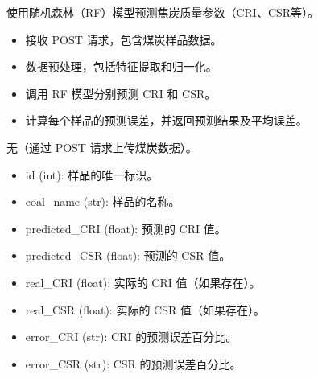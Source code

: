 \documentclass[a4paper,12pt,english]{sphinxmanual}
\begin{document}
\begin{fulllineitems}
\label{\detokenize{api/login:login.getCokeQualityfyeResultAIRF}}
\pysigstartsignatures
{}
\pysigstopsignatures
\sphinxAtStartPar
使用随机森林（RF）模型预测焦炭质量参数（CRI、CSR等）。
\begin{description}
\begin{itemize}
\item {} 
\sphinxAtStartPar
接收 POST 请求，包含煤炭样品数据。

\item {} 
\sphinxAtStartPar
数据预处理，包括特征提取和归一化。

\item {} 
\sphinxAtStartPar
调用 RF 模型分别预测 CRI 和 CSR。

\item {} 
\sphinxAtStartPar
计算每个样品的预测误差，并返回预测结果及平均误差。

\end{itemize}

\sphinxAtStartPar
无（通过 POST 请求上传煤炭数据）。

\begin{description}
\begin{itemize}
\item {} 
\sphinxAtStartPar
id (int): 样品的唯一标识。

\item {} 
\sphinxAtStartPar
coal\_name (str): 样品的名称。

\item {} 
\sphinxAtStartPar
predicted\_CRI (float): 预测的 CRI 值。

\item {} 
\sphinxAtStartPar
predicted\_CSR (float): 预测的 CSR 值。

\item {} 
\sphinxAtStartPar
real\_CRI (float): 实际的 CRI 值（如果存在）。

\item {} 
\sphinxAtStartPar
real\_CSR (float): 实际的 CSR 值（如果存在）。

\item {} 
\sphinxAtStartPar
error\_CRI (str): CRI 的预测误差百分比。

\item {} 
\sphinxAtStartPar
error\_CSR (str): CSR 的预测误差百分比。


\end{itemize}
\end{description}
\end{description}
\end{fulllineitems}
\end{document}
